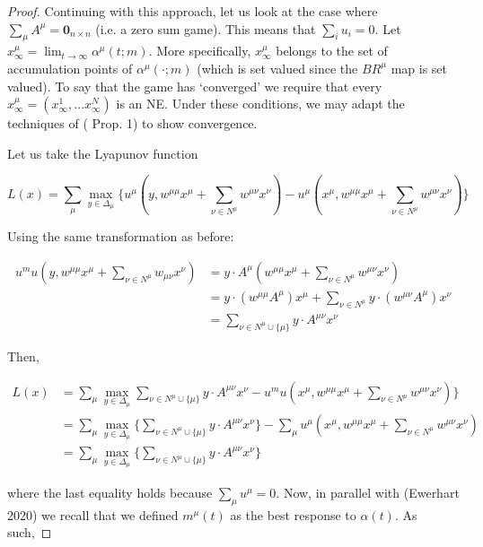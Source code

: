 \documentclass{article}
\theoremstyle{definition}
\newcommand{\wmunu}{w^{\mu \nu}}
\newcommand{\xmu}{x^{\mu}}
\newcommand{\xnu}{x^{\nu}}
\begin{document}
\begin{proof}
    Continuing with this approach, let us look at the case where $\sum_\mu A^\mu =
    \textbf{0}_{n\times n}$ (i.e. a zero sum game). This means that $\sum_i u_i = 0$. Let
    $\xmu_\infty = \lim_{t \rightarrow \infty} \alpha^\mu(t; m)$. More specifically, $\xmu_\infty$
    belongs to the set of accumulation points of $\alpha^\mu(\cdot; m)$ (which is set valued since
    the $BR^\mu$ map is set valued). To say that the game has `converged' we require that every
    $\xmu_\infty = (x^1_\infty, ... x^N_\infty)$ is an NE. Under these conditions, we may adapt the
    techniques of (\cite{Ewerhart} Prop. 1) to show convergence.
    
    
    Let us take the Lyapunov function
    
    \begin{equation}
      L(x) = \sum_\mu \max_{y \in \Delta_\mu} \{u^\mu(y, w^{\mu \mu} \xmu + \sum_{\nu \in N^\mu} \wmunu \xnu) - u^\mu(\xmu, w^{\mu \mu} \xmu + \sum_{\nu \in N^\mu} \wmunu \xnu) \}
    \end{equation}
    
    Using the same transformation as before:
    
    \begin{align}
       u^mu(y, w^{\mu \mu} \xmu + \sum_{\nu \in N^\mu} w_{\mu \nu} \xnu) & =  y \cdot A^\mu (w^{\mu \mu} \xmu + \sum_{\nu \in N^\mu} \wmunu \xnu) \nonumber \\
       & =  y \cdot (w^{\mu \mu} A^\mu) \xmu + \sum_{\nu \in N^\mu} y \cdot (\wmunu A^\mu) \xnu \nonumber \\
        & =  \sum_{\nu \in N^\mu \cup \{\mu\}} y \cdot A^{\mu \nu} \xnu \nonumber 
    \end{align}
    
    Then,
    
    \begin{align}
    L(x) &= \sum_\mu \max_{y \in \Delta_\mu}\sum_{\nu \in N^\mu \cup \{\mu\}} y \cdot A^{\mu \nu} \xnu  - u^mu(\xmu, w^{\mu \mu} \xmu + \sum_{\nu \in N^\mu} w^{\mu \nu} \xnu) \} \nonumber \\
    &= \sum_\mu \max_{y \in \Delta_\mu} \{\sum_{\nu \in N^\mu \cup \{\mu\}} y \cdot A^{\mu \nu} \xnu  \} - \sum_\mu  u^\mu(\xmu, w^{\mu \mu} \xmu + \sum_{\nu \in N^\mu} w^{\mu \nu} \xnu) \nonumber \\
    &= \sum_\mu \max_{y \in \Delta_\mu} \{\sum_{\nu \in N^\mu \cup \{\mu\}} y \cdot A^{\mu \nu} \xnu  \} \nonumber 
    \end{align}
    
    where the last equality holds because $\sum_\mu u^\mu = 0$. Now, in parallel with (Ewerhart 2020) we recall that we defined $m^\mu(t)$ as the best response to $\alpha(t)$. As such,


\end{proof}
\end{document}
